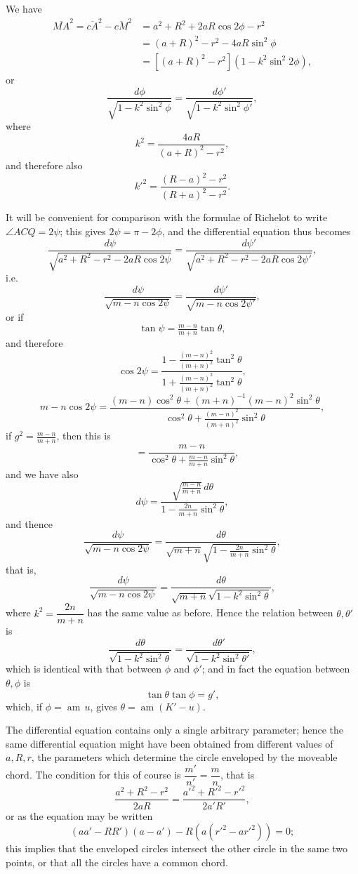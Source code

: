 \documentclass[12pt,a4paper]{article}
\providecommand{\am}{\mathop{\mathrm{am}}}
\theoremstyle{plain}
\begin{document}
We have
\begin{align*}
\overline{MA}^2=\overline{cA}^2-\overline{cM}^2 &= a^2+R^2+2aR\cos 2\phi-r^2\\
&= (a+R)^2-r^2-4aR\sin^2\phi\\
&= [(a+R)^2-r^2](1-k^2\sin^2 2\phi),
\end{align*}
or
\[
\frac{d\phi}{\sqrt{1-k^2\sin^2\phi}}=\frac{d\phi'}{\sqrt{1-k^2\sin^2\phi'}},
\]
where
\[
k^2=\frac{4aR}{(a+R)^2-r^2},
\]
and therefore also
\[
k'^2=\frac{(R-a)^2-r^2}{(R+a)^2-r^2}.
\]

It will be convenient for comparison with the formulae of Richelot to write $\angle ACQ=2\psi$; this gives $2\psi=\pi-2\phi$, and the differential equation thus becomes
\[
\frac{d\psi}{\sqrt{a^2+R^2-r^2-2aR\cos 2\psi}}=\frac{d\psi'}{\sqrt{a^2+R^2-r^2-2aR\cos 2\psi'}},
\]
i.e.
\[
\frac{d\psi}{\sqrt{m-n\cos 2\psi}}=\frac{d\psi'}{\sqrt{m-n\cos 2\psi'}},
\]
or if
\[
\tan\psi=\tfrac{m-n}{m+n}\tan\theta,
\]
and therefore
\[
\cos 2\psi=\frac{1-\tfrac{(m-n)^2}{(m+n)^2}\tan^2\theta}{1+\tfrac{(m-n)^2}{(m+n)^2}\tan^2\theta},
\]
\[
m-n\cos 2\psi=\frac{(m-n)\cos^2\theta+(m+n)^{-1}(m-n)^2\sin^2\theta}{\cos^2\theta+\tfrac{(m-n)^2}{(m+n)^2}\sin^2\theta},
\]
if $g^2=\tfrac{m-n}{m+n}$, then this is
\[
\quad=\frac{m-n}{\cos^2\theta+\tfrac{m-n}{m+n}\sin^2\theta},
\]
and we have also
\[
d\psi=\frac{\sqrt{\tfrac{m-n}{m+n}}\,d\theta}{1-\tfrac{2n}{m+n}\sin^2\theta},
\]
and thence
\[
\frac{d\psi}{\sqrt{m-n\cos 2\psi}}=\frac{d\theta}{\sqrt{m+n}\sqrt{1-\tfrac{2n}{m+n}\sin^2\theta}},
\]
that is,
\[
\frac{d\psi}{\sqrt{m-n\cos 2\psi}}=\frac{d\theta}{\sqrt{m+n}\sqrt{1-k^2\sin^2\theta}},
\]
where $k^2=\dfrac{2n}{m+n}$ has the same value as before. Hence the relation between $\theta,\theta'$ is
\[
\frac{d\theta}{\sqrt{1-k^2\sin^2\theta}}=\frac{d\theta'}{\sqrt{1-k^2\sin^2\theta'}},
\]
which is identical with that between $\phi$ and $\phi'$; and in fact the equation between $\theta,\phi$ is
\[
\tan\theta\tan\phi=g',
\]
which, if $\phi=\am\,u$, gives $\theta=\am(K'-u)$.

\medskip

The differential equation contains only a single arbitrary parameter; hence the same differential equation might have been obtained from different values of $a,R,r$, the parameters which determine the circle enveloped by the moveable chord. The condition for this of course is $\dfrac{m'}{n'}=\dfrac{m}{n}$, that is
\[
\frac{a^2+R^2-r^2}{2aR}=\frac{a'^2+R'^2-r'^2}{2a'R'},
\]
or as the equation may be written
\[
(aa'-RR')(a-a')-R(a(r'^2-ar'^2))=0;
\]
this implies that the enveloped circles intersect the other circle in the same two points, or that all the circles have a common chord.
\end{document}

